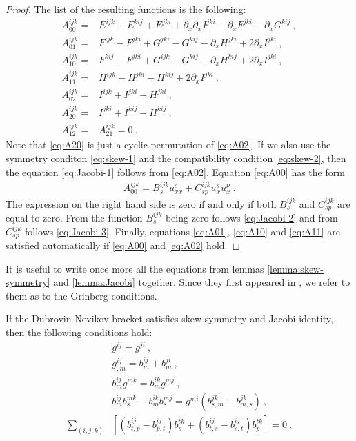 \begin{proof}
    The list of the resulting functions is the following:
    \begin{align}
        A_{00}^{ijk} =& E^{ijk} + E^{kij} + E^{jki} + \partial_x \partial_x I^{jki} - \partial_x F^{jki} - \partial_x G^{kij} \:, \label{eq:A00}\\
        A_{01}^{ijk} =& F^{ijk} - F^{jki} + G^{jki} - G^{kij} - \partial_x H^{jki} + 2 \partial_x I^{jki} \:, \label{eq:A01}\\
        A_{10}^{ijk} =& F^{kij} - F^{jki} + G^{ijk} - G^{kij} - \partial_x H^{kij} + 2 \partial_x I^{jki} \:, \label{eq:A10}\\
        A_{11}^{ijk} =& H^{ijk} - H^{jki} - H^{kij} + 2 \partial_x I^{jki} \:, \label{eq:A11} \\
        A_{02}^{ijk} =& I^{ijk} + I^{jki} - H^{jki}\:, \label{eq:A02}\\
        A_{20}^{ijk} =& I^{jki} + I^{kij} - H^{kij}\:, \label{eq:A20} \\
        A^{ijk}_{12} =& A^{ijk}_{21} = 0 \:.
    \end{align}
    Note that \eqref{eq:A20} is just a cyclic permutation of \eqref{eq:A02}. If we also use the symmetry conditon \eqref{eq:skew-1} and the compatibility condition \eqref{eq:skew-2}, then the equation \eqref{eq:Jacobi-1} follows from \eqref{eq:A02}. Equation \eqref{eq:A00} has the form
    \begin{align}
        A_{00}^{ijk} = B^{ijk}_s u^s_{xx} + C^{ijk}_{sp} u^s_x u^p_x \:.
    \end{align}
    The expression on the right hand side is zero if and only if both $B^{ijk}_s$ and $C^{ijk}_{sp}$ are equal to zero. From the function $B^{ijk}_s$ being zero follows \eqref{eq:Jacobi-2} and from $C^{ijk}_{sp}$ follows \eqref{eq:Jacobi-3}. Finally, equations \eqref{eq:A01}, \eqref{eq:A10} and \eqref{eq:A11} are satisfied automatically if \eqref{eq:A00} and \eqref{eq:A02} hold.
\end{proof}

It is useful to write once more all the equations from lemmas \vref{lemma:skew-symmetry} and \vref{lemma:Jacobi} together. Since they first appeared in \cite{Grinberg}, we refer to them as to the Grinberg conditions.
\begin{lemma} \label{Grinberg conditions}
    If the Dubrovin-Novikov bracket satisfies skew-symmetry and Jacobi identity, then the following conditions hold:
    \begin{align}
        &g^{ij} = g^{ji} \:, \label{eq:Grinberg-1}\\
        &g^{ij}_{,m} = b^{ij}_m + b^{ji}_m \:, \label{eq:Grinberg-2}\\
        &b^{ij}_m g^{mk} = b^{ik}_m g^{mj} \:, \label{eq:Grinberg-3}\\
        &b^{ij}_{m} b^{mk}_s - b^{ik}_m b^{mj}_s = g^{mi} \left( b^{jk}_{s,m} - b^{jk}_{m,s} \right) \:, \label{eq:Grinberg-4}\\
        \sum_{(i,j,k)}& \left[ (b^{ij}_{t,p} - b^{ij}_{p,t}) b^{tk}_s + (b^{ij}_{t,s} - b^{ij}_{s,t}) b^{tk}_p \right] = 0 \:. \label{eq:Grinberg-5}
    \end{align}
\end{lemma}

